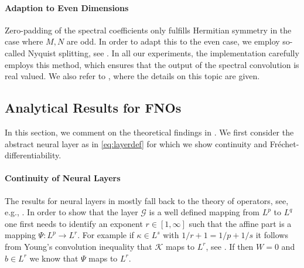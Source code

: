 \paragraph{Adaption to Even Dimensions}
%
%
Zero-padding of the spectral coefficients only fulfills Hermitian symmetry in the case where $M,N$ are odd. In order to adapt this to the even case, we employ so-called Nyquist splitting, see \cite{trigo19}. In all our experiments, the implementation carefully employs this method, which ensures that the output of the spectral convolution is real valued. We also refer to \cite[Sec. 3.3]{kabri2023resolution}, where the details on this topic are given.
%
%
\subsection{Analytical Results for FNOs}\label{sec:FNOAna}
%
%
In this section, we comment on the theoretical findings in \cite{kabri2023resolution}. We first consider the abstract neural layer as in \cref{eq:layerdef} for which we show continuity and Fréchet-differentiability.
%
%
\paragraph{Continuity of Neural Layers} The results for neural layers in \cite{kabri2023resolution} mostly fall back to the theory of \Nem{} operators, see, e.g., \cite{tröltzsch, ambrosetti}. In order to show that the layer $\mathcal{G}$ is a well defined mapping from $L^p$ to $L^q$ one first needs to identify an exponent $r\in [1,\infty]$ such that the affine part is a mapping $\Psi:L^p\to L^r$. For example if $\kappa\in L^s$ with $1/r + 1 = 1/p + 1/s$ it follows from Young's convolution inequality that $\mathcal{K}$ maps to $L^r$, see \cite[Th. 1.2.12]{grafakos}. If then $W=0$ and $b\in L^r$ we know that $\Psi$ maps to $L^r$.

